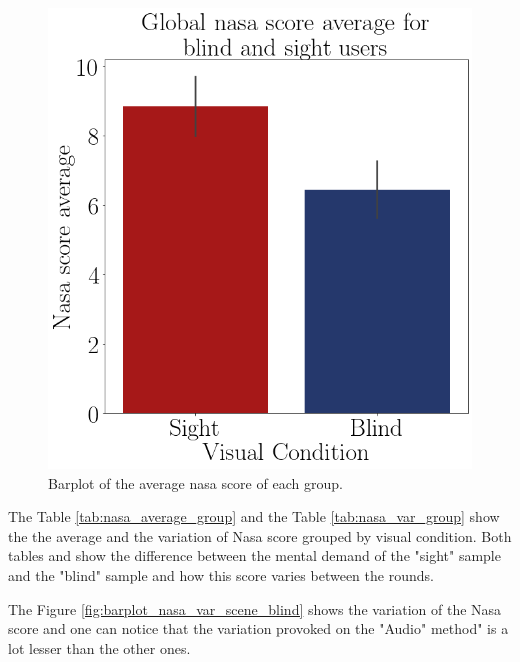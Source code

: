 \begin{figure}[!htb]
\begin{minipage}{.45\linewidth}
        \includegraphics[width = \linewidth]{Resultados/Nasa/Figuras/png/barplot_nasa_avg_global.png}
        \caption{Barplot of the average nasa score of each group.}
        \label{fig:barplot_nasa_global}
    \end{minipage}
\end{figure}

The Table \ref{tab:nasa_average_group} and the Table \ref{tab:nasa_var_group} show the the average and the variation of Nasa score grouped by visual condition. Both tables and show the difference between the mental demand of the "sight" sample and the "blind" sample and how this score varies between the rounds.





The Figure \ref{fig:barplot_nasa_var_scene_blind} shows the variation of the Nasa score and one can notice that the variation provoked on the "Audio" method" is a lot lesser than the other ones.

